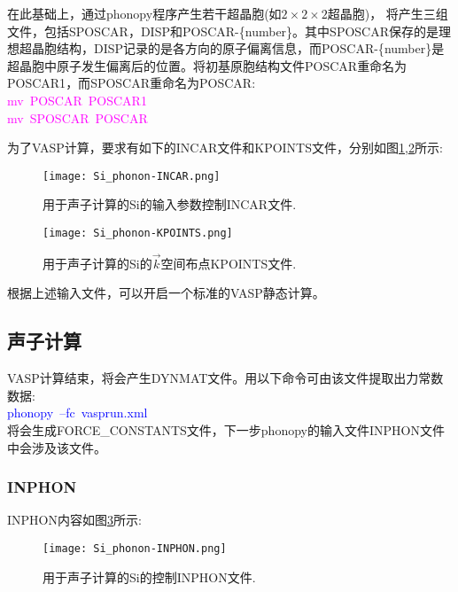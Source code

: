 在此基础上，通过\textrm{phonopy}程序产生若干超晶胞(如$2\times2\times2$超晶胞)，%
将产生三组文件，包括\textrm{SPOSCAR}，\textrm{DISP}和\textrm{POSCAR}-\{\textrm{number}\}。其中\textrm{SPOSCAR}保存的是理想超晶胞结构，\textrm{DISP}记录的是各方向的原子偏离信息，而\textrm{POSCAR}-\{\textrm{number}\}是超晶胞中原子发生偏离后的位置。将初基原胞结构文件\textrm{POSCAR}重命名为\textrm{POSCAR1}，而\textrm{SPOSCAR}重命名为\textrm{POSCAR}:~\\
\textcolor{magenta}{\textrm{mv~POSCAR~POSCAR1}}\\
\textcolor{magenta}{\textrm{mv~SPOSCAR~POSCAR}}

为了\textrm{VASP}计算，要求有如下的\textrm{INCAR}文件和\textrm{KPOINTS}文件，分别如图\ref{Si_phonon-INCAR},\ref{Si_phonon-KPOINTS}所示:~
\begin{figure}[h!]
\centering
\texttt{[image: Si\_phonon-INCAR.png]}
\caption{\small \textrm{用于声子计算的\textrm{Si}的输入参数控制\textrm{INCAR}文件.}}%
\label{Si_phonon-INCAR}
\end{figure}
\begin{figure}[h!]
\centering
\vskip -20pt
\texttt{[image: Si\_phonon-KPOINTS.png]}
\caption{\small \textrm{用于声子计算的\textrm{Si}的$\vec k$空间布点\textrm{KPOINTS}文件.}}%
\label{Si_phonon-KPOINTS}
\end{figure}
根据上述输入文件，可以开启一个标准的\textrm{VASP}静态计算。
\subsection{声子计算}
\textrm{VASP}计算结束，将会产生\textrm{DYNMAT}文件。用以下命令可由该文件提取出力常数数据:\\
\textcolor{blue}{\textrm{phonopy~--fc~vasprun.xml}}\\
将会生成\textrm{FORCE\_CONSTANTS}文件，下一步\textrm{phonopy}的输入文件\textrm{INPHON}文件中会涉及该文件。
\subsubsection{\rm{INPHON}}
\textrm{INPHON}内容如图\ref{Si_phonon-INPHON}所示:~
\begin{figure}[h!]
\centering
\texttt{[image: Si\_phonon-INPHON.png]}
\caption{\small \textrm{用于声子计算的\textrm{Si}的控制\textrm{INPHON}文件.}}%
\label{Si_phonon-INPHON}
\end{figure}

